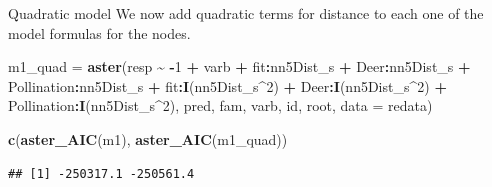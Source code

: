 \documentclass[
  ignorenonframetext,
]{beamer}
\newenvironment{Shaded}{\begin{snugshade}}{\end{snugshade}}
\newcommand{\AttributeTok}[1]{\textcolor[rgb]{0.13,0.29,0.53}{#1}}
\newcommand{\DecValTok}[1]{\textcolor[rgb]{0.00,0.00,0.81}{#1}}
\newcommand{\FunctionTok}[1]{\textcolor[rgb]{0.13,0.29,0.53}{\textbf{#1}}}
\newcommand{\NormalTok}[1]{#1}
\newcommand{\OtherTok}[1]{\textcolor[rgb]{0.56,0.35,0.01}{#1}}
\newcommand{\SpecialCharTok}[1]{\textcolor[rgb]{0.81,0.36,0.00}{\textbf{#1}}}
\begin{document}
\begin{frame}[fragile]{Quadratic model}
\protect\hypertarget{quadratic-model}{}
We now add quadratic terms for distance to each one of the model
formulas for the nodes.

\vspace{12pt}
\tiny

\begin{Shaded}
\begin{Highlighting}[]
\NormalTok{m1\_quad }\OtherTok{=}
  \FunctionTok{aster}\NormalTok{(resp }\SpecialCharTok{\textasciitilde{}} \SpecialCharTok{{-}}\DecValTok{1} \SpecialCharTok{+}\NormalTok{ varb }\SpecialCharTok{+}\NormalTok{ fit}\SpecialCharTok{:}\NormalTok{nn5Dist\_s }\SpecialCharTok{+}\NormalTok{ Deer}\SpecialCharTok{:}\NormalTok{nn5Dist\_s }\SpecialCharTok{+} 
\NormalTok{          Pollination}\SpecialCharTok{:}\NormalTok{nn5Dist\_s }\SpecialCharTok{+} 
\NormalTok{          fit}\SpecialCharTok{:}\FunctionTok{I}\NormalTok{(nn5Dist\_s}\SpecialCharTok{\^{}}\DecValTok{2}\NormalTok{) }\SpecialCharTok{+}\NormalTok{ Deer}\SpecialCharTok{:}\FunctionTok{I}\NormalTok{(nn5Dist\_s}\SpecialCharTok{\^{}}\DecValTok{2}\NormalTok{) }\SpecialCharTok{+} 
\NormalTok{          Pollination}\SpecialCharTok{:}\FunctionTok{I}\NormalTok{(nn5Dist\_s}\SpecialCharTok{\^{}}\DecValTok{2}\NormalTok{),}
\NormalTok{    pred, fam, varb, id, root, }\AttributeTok{data =}\NormalTok{ redata)}

\FunctionTok{c}\NormalTok{(}\FunctionTok{aster\_AIC}\NormalTok{(m1), }\FunctionTok{aster\_AIC}\NormalTok{(m1\_quad))}
\end{Highlighting}
\end{Shaded}

\begin{verbatim}
## [1] -250317.1 -250561.4
\end{verbatim}
\end{frame}
\end{document}
